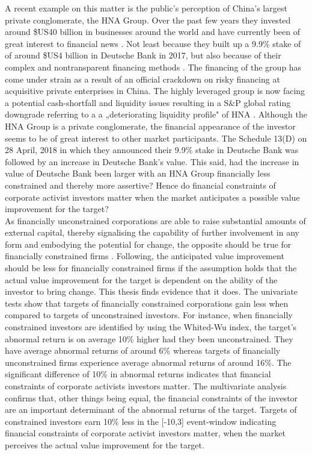 \documentclass[12pt]{article}
\begin{document}
A recent example on this matter is the public's perception of China's largest private conglomerate, the HNA Group. Over the past few years they invested around \$US40 billion in businesses around the world and have currently been of great interest to financial news \citep{Smith2018}. Not least because they built up a 9.9\% stake of of around \$US4 billion in Deutsche Bank in 2017, but also because of their complex and nontransparent financing methods \citep{Lockett2018}.
The financing of the group has come under strain as a result of an official crackdown on risky financing at acquisitive private enterprises in China. The highly leveraged group is now facing a potential cash-shortfall and liquidity issues resulting in a S\&P global rating downgrade referring to a a „deteriorating liquidity profile" of HNA \citep{Schuetze2018}. Although the HNA Group is a private conglomerate, the financial appearance of the investor seems to be of great interest to other market participants. The Schedule 13(D) on 28 April, 2018 in which they announced their 9.9\% stake in Deutsche Bank was followed by an increase in Deutsche Bank's value. This said, had the increase in value of Deutsche Bank been larger with an HNA Group financially less constrained and thereby more assertive? Hence do financial constraints of corporate activist investors matter when the market anticipates a possible value improvement for the target?\\ 
As financially unconstrained corporations are able to raise substantial amounts of external capital, thereby signalising the capability of further involvement in any form and embodying the potential for change, the opposite should be true for financially constrained firms \citep[p.1]{Farre-mensa2013}. Following, the anticipated value improvement should be less for financially constrained firms if the assumption holds that the actual value improvement for the target is dependent on the ability of the investor to bring change.
This thesis finds evidence that it does. The univariate tests show that targets of financially constrained corporations gain less when compared to targets of unconstrained investors. For instance, when financially constrained investors are identified by using the Whited-Wu index, the target's abnormal return is on average 10\% higher had they been unconstrained. They have average abnormal returns of around 6\% whereas targets of financially unconstrained firms experience average abnormal returns of around 16\%. The significant difference of 10\% in abnormal returns indicates that financial constraints of corporate activists investors matter. The multivariate analysis confirms that, other things being equal, the financial constraints of the investor are an important determinant of the abnormal returns of the target. Targets of constrained investors earn 10\% less in the [-10,3] event-window indicating financial constraints of corporate activist investors matter, when the market perceives the actual value improvement for the target. 
\end{document}
